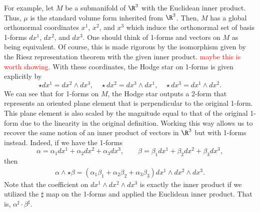 For example, let $M$ be a submanifold of $\R^3$ with the Euclidean inner product.  Thus, $\mu$ is the standard volume form inherited from $\R^3$. Then, $M$ has a global orthonormal coordinates $x^1$, $x^2$, and $x^3$ which induce the orthonormal set of basis 1-forms  $dx^1$, $dx^2$, and $dx^3$. One should think of 1-forms and vectors on $M$ as being equivalent. Of course, this is made rigorous by the isomorphism given by the Riesz representation theorem with the given inner product. \textcolor{red}{maybe this is worth showing.} With these coordinates, the Hodge star on 1-forms is given explicitly by
\[
\star dx^1 = dx^2 \wedge dx^3, \quad \star dx^2 = dx^3 \wedge dx^1, \quad \star dx^3 = dx^1 \wedge dx^2.
\]
We can see that for 1-forms on $M$, the Hodge star outputs a 2-form that represents an oriented plane element that is perpendicular to the original 1-form. This plane element is also scaled by the magnitude equal to that of the original 1-form due to the linearity in the original definition.  Working this way allows us to recover the same notion of an inner product of vectors in $\R^3$ but with 1-forms instead.  Indeed, if we have the 1-forms
\[
\alpha = \alpha_1 dx^1 + \alpha_2 dx^2 + \alpha_3 dx^3, \qquad \beta = \beta_1 dx^1 + \beta_2 dx^2 + \beta_3 dx^3,
\]
then 
\begin{align*}
\alpha \wedge \star \beta = (\alpha_1 \beta_1 + \alpha_2 \beta_2 + \alpha_3 \beta_3)dx^1\wedge dx^2 \wedge dx^3.
\end{align*}
Note that the coefficient on $dx^1\wedge dx^2 \wedge dx^3$ is exactly the inner product if we utilized the $\sharp$ map on the 1-forms and applied the Euclidean inner product. That is, $\alpha^\sharp \cdot \beta^\sharp$.

